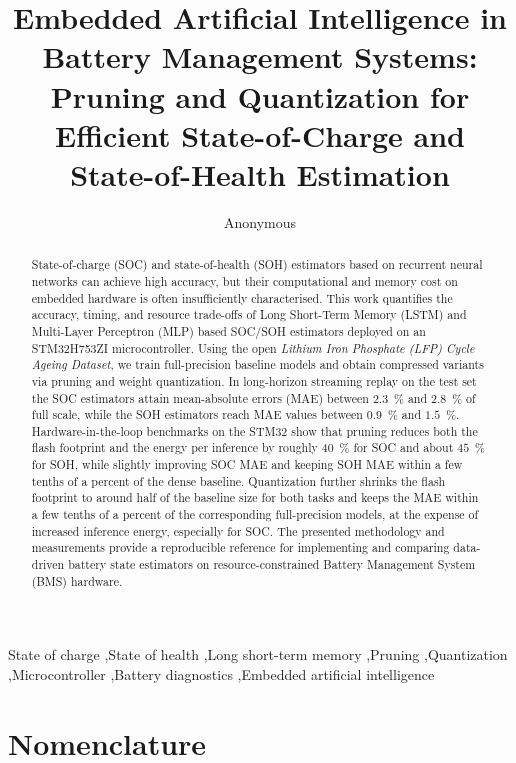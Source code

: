 \documentclass[review]{elsarticle}
\date{}
\begin{document}
\linenumbers
\begin{frontmatter}
\title{Embedded Artificial Intelligence in Battery Management Systems: Pruning and Quantization for Efficient State-of-Charge and State-of-Health Estimation}
\author{Anonymous}
\begin{abstract}
State-of-charge (SOC) and state-of-health (SOH) estimators based on recurrent neural networks can achieve high accuracy, but their computational and memory cost on embedded hardware is often insufficiently characterised. This work quantifies the accuracy, timing, and resource trade-offs of Long Short-Term Memory (LSTM) and Multi-Layer Perceptron (MLP) based SOC/SOH estimators deployed on an STM32H753ZI microcontroller. Using the open \emph{Lithium Iron Phosphate (LFP) Cycle Ageing Dataset}, we train full-precision baseline models and obtain compressed variants via pruning and weight quantization. In long-horizon streaming replay on the test set the SOC estimators attain mean-absolute errors (MAE) between $2.3$~\% and $2.8$~\% of full scale, while the SOH estimators reach MAE values between $0.9$~\% and $1.5$~\%. Hardware-in-the-loop benchmarks on the STM32 show that pruning reduces both the flash footprint and the energy per inference by roughly $40$~\% for SOC and about $45$~\% for SOH, while slightly improving SOC MAE and keeping SOH MAE within a few tenths of a percent of the dense baseline. Quantization further shrinks the flash footprint to around half of the baseline size for both tasks and keeps the MAE within a few tenths of a percent of the corresponding full-precision models, at the expense of increased inference energy, especially for SOC. The presented methodology and measurements provide a reproducible reference for implementing and comparing data-driven battery state estimators on resource-constrained Battery Management System (BMS) hardware.
\end{abstract}
\begin{keyword}
State of charge \sep State of health \sep Long short-term memory \sep Pruning \sep Quantization \sep Microcontroller \sep Battery diagnostics \sep Embedded artificial intelligence
\end{keyword}
\end{frontmatter}
\section*{Nomenclature}
\small
\end{document}

